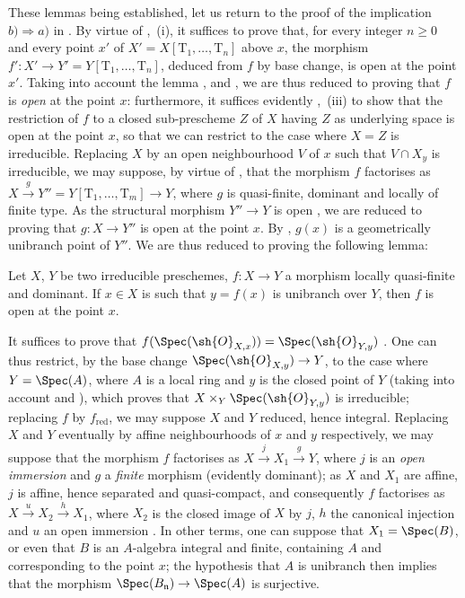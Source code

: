 These lemmas being established, let us return to the proof of the implication $b)\Rightarrow a)$ in .
By virtue of ,~(i), it suffices to prove that, for every integer $n\geq 0$ and every point $x'$ of $X'=X[\mathrm{T}_1,\ldots,\mathrm{T}_n]$ above $x$, the morphism
$f':X'\to Y'=Y[\mathrm{T}_1,\ldots,\mathrm{T}_n]$, deduced from $f$ by base change, is open at the point $x'$.
Taking into account the lemma ,  and , we are thus reduced to proving that $f$ is \emph{open} at the point $x$: furthermore, it suffices evidently ,~(iii) to show that the restriction of $f$ to a closed sub-prescheme $Z$ of $X$ having $Z$ as underlying space is open at the point $x$, so that we can restrict to the case where $X=Z$ is irreducible.
Replacing $X$ by an open neighbourhood $V$ of $x$ such that $V\cap X_y$ is irreducible, we may suppose, by virtue of , that the morphism $f$ factorises as $X\xrightarrow{g}Y''=Y[\mathrm{T}_1,\ldots,\mathrm{T}_m]\to Y$, where $g$ is quasi-finite, dominant and locally of finite type.
As the structural morphism $Y''\to Y$ is open , we are reduced to proving that $g:X\to Y''$ is open at the point $x$.
By , $g(x)$ is a geometrically unibranch point of $Y''$.
We are thus reduced to proving the following lemma:

\begin{lemma}[14.4.1.3]
\label{IV.14.4.1.3}
Let $X$, $Y$ be two irreducible preschemes, $f:X\to Y$ a morphism locally quasi-finite and dominant.
If $x\in X$ is such that $y=f(x)$ is unibranch over $Y$, then $f$ is open at the point $x$.
\end{lemma}

It suffices to prove that $f(\Spec(\sh{O}_{X,x}))=\Spec(\sh{O}_{Y,y})$ .
One can thus restrict, by the base change $\Spec(\sh{O}_{X,y})\to Y$, to the case where $Y=\Spec(A)$, where $A$ is a local ring and $y$ is the closed point of $Y$ (taking into account  and ), which proves that $X\times_Y\Spec(\sh{O}_{Y,y})$ is irreducible; replacing $f$ by $f_{\mathrm{red}}$, we may suppose $X$ and $Y$ reduced, hence integral.
Replacing $X$ and $Y$ eventually by affine neighbourhoods of $x$ and $y$ respectively, we may suppose  that the morphism $f$ factorises as $X\xrightarrow{j}X_1\xrightarrow{g}Y$, where $j$ is an \emph{open immersion} and $g$ a \emph{finite} morphism (evidently dominant); as $X$ and $X_1$ are affine, $j$ is affine, hence separated and quasi-compact, and consequently $f$ factorises as $X\xrightarrow{u}X_2\xrightarrow{h}X_1$, where $X_2$ is the closed image of $X$ by $j$, $h$ the canonical injection and $u$ an open immersion .
In other terms, one can suppose that $X_1=\Spec(B)$, or even that $B$ is an $A$-algebra integral and finite, containing $A$ and corresponding to the point $x$; the hypothesis that $A$ is unibranch then implies  that the morphism $\Spec(B_\mathfrak{n})\to\Spec(A)$ is surjective.

